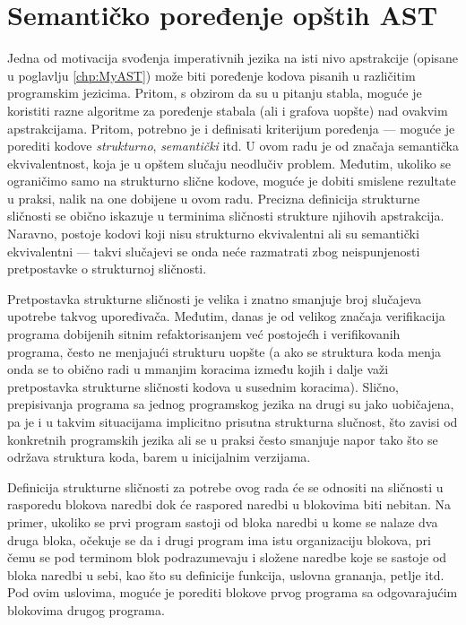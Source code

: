 \chapter{Semantičko poređenje opštih AST}
\label{chp:ASTComparing}

Jedna od motivacija svođenja imperativnih jezika na isti nivo apstrakcije (opisane u poglavlju \ref{chp:MyAST}) može biti poređenje kodova pisanih u različitim programskim jezicima. Pritom, s obzirom da su u pitanju stabla, moguće je koristiti razne algoritme za poređenje stabala (ali i grafova uopšte) nad ovakvim apstrakcijama. Pritom, potrebno je i definisati kriterijum poređenja --- moguće je porediti kodove \emph{strukturno}, \emph{semantički} itd. U ovom radu je od značaja semantička ekvivalentnost, koja je u opštem slučaju neodlučiv problem. Međutim, ukoliko se ograničimo samo na strukturno slične kodove, moguće je dobiti smislene rezultate u praksi, nalik na one dobijene u ovom radu. Precizna definicija strukturne sličnosti se obično iskazuje u terminima sličnosti strukture njihovih apstrakcija. Naravno, postoje kodovi koji nisu strukturno ekvivalentni ali su semantički ekvivalentni --- takvi slučajevi se onda neće razmatrati zbog neispunjenosti pretpostavke o strukturnoj sličnosti. 

Pretpostavka strukturne sličnosti je velika i znatno smanjuje broj slučajeva upotrebe takvog upoređivača. Međutim, danas je od velikog značaja verifikacija programa dobijenih sitnim refaktorisanjem već postojećh i verifikovanih programa, često ne menjajući strukturu uopšte (a ako se struktura koda menja onda se to obično radi u mmanjim koracima između kojih i dalje važi pretpostavka strukturne sličnosti kodova u susednim koracima). Slično, prepisivanja programa sa jednog programskog jezika na drugi su jako uobičajena, pa je i u takvim situacijama implicitno prisutna strukturna slučnost, što zavisi od konkretnih programskih jezika ali se u praksi često smanjuje napor tako što se održava struktura koda, barem u inicijalnim verzijama. 

Definicija strukturne sličnosti za potrebe ovog rada će se odnositi na sličnosti u rasporedu blokova naredbi dok će raspored naredbi u blokovima biti nebitan. Na primer, ukoliko se prvi program sastoji od bloka naredbi u kome se nalaze dva druga bloka, očekuje se da i drugi program ima istu organizaciju blokova, pri čemu se pod terminom blok podrazumevaju i složene naredbe koje se sastoje od bloka naredbi u sebi, kao što su definicije funkcija, uslovna grananja, petlje itd. Pod ovim uslovima, moguće je porediti blokove prvog programa sa odgovarajućim blokovima drugog programa.

